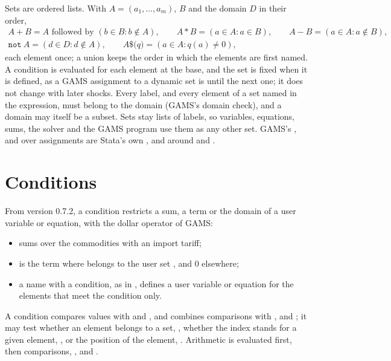 Sets are ordered lists. With $A = (a_1, \dots, a_m)$, $B$ and the domain $D$
in their order,
\begin{gather*}
A + B = A \text{ followed by } (b \in B : b \notin A), \qquad
A * B = (a \in A : a \in B), \qquad
A - B = (a \in A : a \notin B),\\
\texttt{not}\ A = (d \in D : d \notin A), \qquad
A\texttt{\$(}q\texttt{)} = (a \in A : q(a) \ne 0),
\end{gather*}
each element once; a union keeps the order in which the elements are first
named. A condition is evaluated for each element at the base, and the set is
fixed when it is defined, as a GAMS assignment to a dynamic set is until the
next one; it does not change with later shocks. Every label, and every
element of a set named in the expression, must belong to the domain (GAMS's
domain check), and a domain may itself be a subset. Sets stay lists of
labels, so variables, equations, sums, the solver and the GAMS program use
them as any other set. GAMS's ,  and  over
assignments are Stata's own ,  and  around
 and .

\section{Conditions}\label{sec:userconditions}

From version 0.7.2, a condition restricts a sum, a term or the domain of a user
variable or equation, with the dollar operator of GAMS:
\begin{itemize}
\item {} sums over the commodities with
an import tariff;
\item {} is the term where  belongs
to the user set , and 0 elsewhere;
\item a name with a condition, as in 
, defines a user variable or equation for the
elements that meet the condition only.
\end{itemize}
A condition compares values with \cmd{> < >= <= ==} and \cmd{!=}, and combines
comparisons with \cmd{&}, \cmd{|} and \cmd{!}; it may test whether an element
belongs to a set, , whether the index stands for a given element,
, or the position of the element, .
Arithmetic is evaluated first, then comparisons, \cmd{!}, \cmd{&} and
\cmd{|}.

